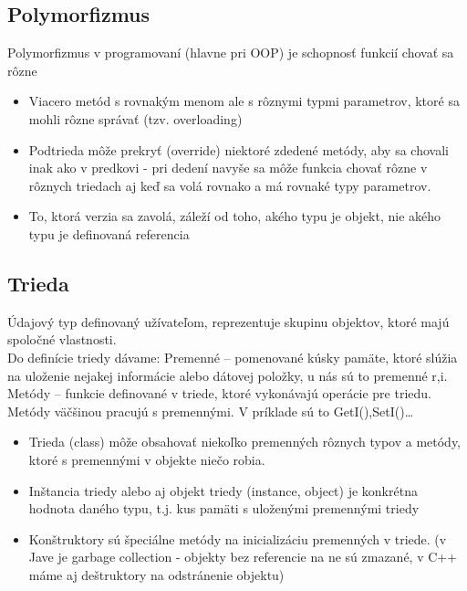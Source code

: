 	\subsection{Polymorfizmus}
		Polymorfizmus v programovaní (hlavne pri OOP) je schopnosť funkcií chovať sa rôzne
		\begin{itemize}
			\item Viacero metód s rovnakým menom ale s rôznymi typmi parametrov, ktoré sa mohli rôzne správať (tzv. overloading)

			\item Podtrieda môže prekryť (override) niektoré zdedené metódy, aby sa chovali inak ako v predkovi - pri dedení navyše sa môže funkcia chovať rôzne v rôznych triedach aj keď sa volá rovnako a má rovnaké typy parametrov.
			\item To, ktorá verzia sa zavolá, záleží od toho, akého typu je objekt, nie akého typu je definovaná referencia
		\end{itemize}

	\subsection{Trieda}
	Údajový typ definovaný užívateľom, reprezentuje skupinu objektov, ktoré majú spoločné vlastnosti.\\
	Do definície triedy dávame: Premenné -- pomenované kúsky pamäte, ktoré slúžia na uloženie nejakej informácie alebo dátovej položky, u nás sú to premenné r,i. Metódy – funkcie definované v triede, ktoré vykonávajú operácie pre triedu. Metódy väčšinou pracujú s premennými. V príklade sú to GetI(),SetI()…


		\begin{itemize}
			\item Trieda (class) môže obsahovať niekoľko premenných rôznych typov a metódy, ktoré s premennými v objekte niečo robia.
			\item Inštancia triedy alebo aj objekt triedy (instance, object) je konkrétna hodnota daného typu, t.j. kus pamäti s uloženými premennými triedy
			\item Konštruktory sú špeciálne metódy na inicializáciu premenných v triede. (v Jave je garbage collection - objekty bez referencie na ne sú zmazané, v C++ máme aj deštruktory na odstránenie objektu)
		\end{itemize}
